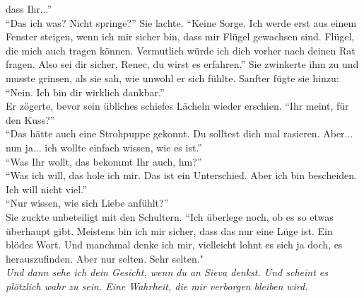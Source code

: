 dass Ihr...'' \\
``Das ich was? Nicht springe?'' Sie lachte. ``Keine Sorge. Ich werde erst aus einem Fenster 
steigen, wenn ich mir sicher bin, dass mir Flügel gewachsen sind. Flügel, die mich auch tragen 
können. Vermutlich würde ich dich vorher nach deinen Rat fragen. Also sei dir sicher, Renec, du 
wirst es erfahren.'' Sie zwinkerte ihm zu und musste grinsen, als sie sah, wie unwohl er sich 
fühlte. Sanfter fügte sie hinzu: ``Nein. Ich bin dir wirklich dankbar.''\\
Er zögerte, bevor sein übliches schiefes Lächeln wieder erschien. ``Ihr meint, für den Kuss?''\\
``Das hätte auch eine Strohpuppe gekonnt. Du solltest dich mal rasieren. Aber... nun ja... ich 
wollte einfach wissen, wie es ist.''\\
``Was Ihr wollt, das bekommt Ihr auch, hm?''\\
``Was ich will, das hole ich mir. Das ist ein Unterschied. Aber ich bin bescheiden. Ich will nicht 
viel.''\\
``Nur wissen, wie sich Liebe anfühlt?''\\
Sie zuckte unbeteiligt mit den Schultern. ``Ich überlege noch, ob es so etwas überhaupt gibt. 
Meistens bin ich mir sicher, dass das nur eine Lüge ist. Ein blödes Wort. Und manchmal denke ich 
mir, vielleicht lohnt es sich ja doch, es herauszufinden. Aber nur selten. Sehr selten."\\
\textit{Und dann sehe ich dein Gesicht, wenn du an Sieva denkst. Und scheint es plötzlich wahr 
zu sein. Eine Wahrheit, die mir verborgen bleiben wird.}
